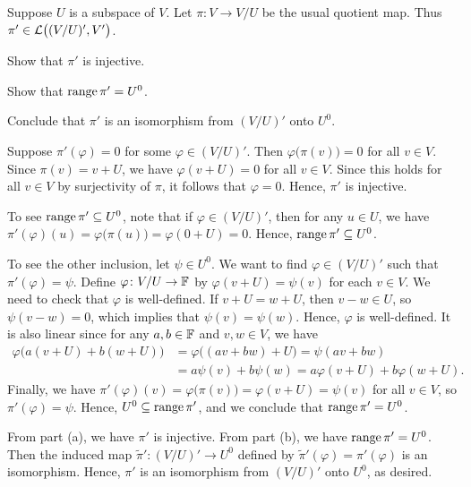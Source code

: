 \begin{exercise}
Suppose $U$ is a subspace of $V$. Let $\pi\colon V\to V/U$ be the usual quotient
map. Thus $\pi'\in\mathcal{L}\bigl((V/U)',V'\bigr)$.
\begin{parts}
\item Show that $\pi'$ is injective.
\item Show that $\operatorname{range}\pi'=U^0$.
\item Conclude that $\pi'$ is an isomorphism from $(V/U)'$ onto $U^0$.
\end{parts}
\end{exercise}
\begin{solution}\leavevmode
\begin{parts}
\item Suppose $\pi'(\varphi)=0$ for some $\varphi\in(V/U)'$. Then
  $\varphi\bigl(\pi(v)\bigr)=0$ for all $v\in V$. Since $\pi(v)=v+U$, we have
  $\varphi(v+U)=0$ for all $v\in V$. Since this holds for all $v\in V$ by
  surjectivity of $\pi$, it follows that $\varphi=0$. Hence, $\pi'$ is
  injective.
\item To see $\operatorname{range}\pi'\subseteq U^0$, note that if $\varphi\in(V/U)'$, then
  for any $u\in U$, we have
  $\pi'(\varphi)(u)=\varphi\bigl(\pi(u)\bigr)=\varphi(0+U)=0$. Hence,
  $\operatorname{range}\pi'\subseteq U^0$.

  To see the other inclusion, let $\psi\in U^0$. We want to find
  $\varphi\in(V/U)'$ such that $\pi'(\varphi)=\psi$. Define
  $\varphi\colon V/U\to\mathbb{F}$ by $\varphi(v+U)=\psi(v)$ for each $v\in V$. We need
  to check that $\varphi$ is well-defined. If $v+U=w+U$, then $v-w\in U$, so
  $\psi(v-w)=0$, which implies that $\psi(v)=\psi(w)$. Hence, $\varphi$ is
  well-defined. It is also linear since for any $a,b\in\mathbb{F}$ and $v,w\in V$, we
  have
  \begin{align*}
  \varphi\bigl(a(v+U)+b(w+U)\bigr) &= \varphi\bigl((av+bw)+U\bigr)
    = \psi(av+bw)\\
   &= a\psi(v)+b\psi(w) = a\varphi(v+U)+b\varphi(w+U).
  \end{align*}
  Finally, we have
  $\pi'(\varphi)(v)=\varphi\bigl(\pi(v)\bigr)=\varphi(v+U)=\psi(v)$ for all
  $v\in V$, so $\pi'(\varphi)=\psi$. Hence, $U^0\subseteq\operatorname{range}\pi'$, and we
  conclude that $\operatorname{range}\pi'=U^0$.
\item From part (a), we have $\pi'$ is injective. From part (b), we have
  $\operatorname{range}\pi'=U^0$. Then the induced map $\tilde{\pi}'\colon(V/U)'\to U^0$
  defined by $\tilde{\pi}'(\varphi)=\pi'(\varphi)$ is an isomorphism. Hence,
  $\pi'$ is an isomorphism from $(V/U)'$ onto $U^0$, as desired.
\end{parts}
\end{solution}
